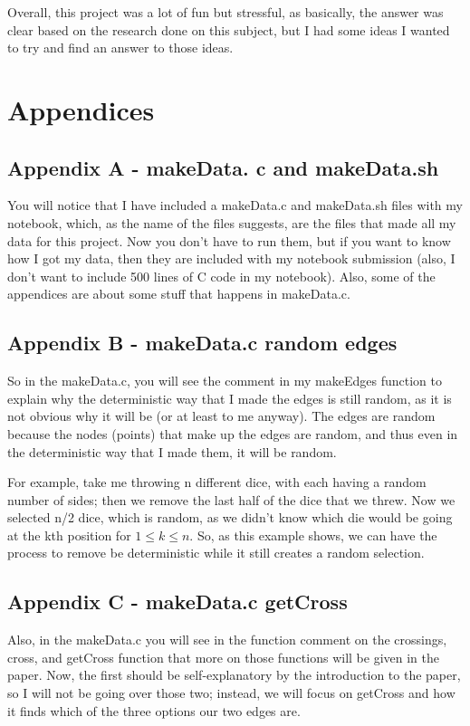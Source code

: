\documentclass{article}
\begin{document}
Overall, this project was a lot of fun but stressful, as basically, the answer was clear based on the research done on this subject, but I had some ideas I wanted to try and find an answer to those ideas.
\section*{Appendices}

\subsection*{Appendix A - makeData. c and makeData.sh}

You will notice that I have included a makeData.c and makeData.sh files with my notebook, which, as the name of the files suggests, are the files that made all my data for this project. Now you don't have to run them, but if you want to know how I got my data, then they are included with my notebook submission (also, I don't want to include 500 lines of C code in my notebook). Also, some of the appendices are about some stuff that happens in makeData.c.

\subsection*{Appendix B - makeData.c random edges}
So in the makeData.c, you will see the comment in my makeEdges function to explain why the deterministic way that I made the edges is still random, as it is not obvious why it will be (or at least to me anyway). The edges are random because the nodes (points) that make up the edges are random, and thus even in the deterministic way that I made them, it will be random. 

For example, take me throwing n different dice, with each having a random number of sides; then we remove the last half of the dice that we threw. Now we selected n/2 dice, which is random, as we didn't know which die would be going at the kth position for $1 \leq k \leq n$. So, as this example shows, we can have the process to remove be deterministic while it still creates a random selection. 

\subsection*{Appendix C - makeData.c getCross}
Also, in the makeData.c  you will see in the function comment on the crossings, cross, and getCross function that more on those functions will be given in the paper. Now, the first should be self-explanatory by the introduction to the paper, so I will not be going over those two; instead, we will focus on getCross and how it finds which of the three options our two edges are.
\end{document}
